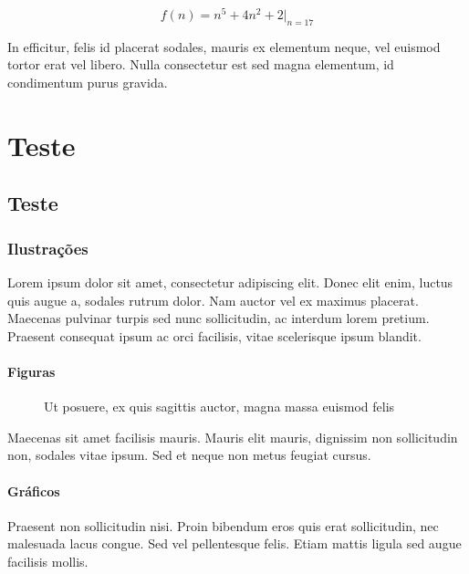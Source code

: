 \documentclass{uecetex}
\begin{document}
	\begin{equation}
		f(n) = n^5 + 4n^2 + 2 |_{n=17}
	\end{equation}
	
	In efficitur, felis id placerat sodales, mauris ex elementum neque, vel euismod tortor erat vel libero. Nulla consectetur est sed magna elementum, id condimentum purus gravida. 
	
	\chapter{Teste}
	\section{Teste}	\lipsum[1]
	
	\subsection{Ilustrações}
	
	Lorem ipsum dolor sit amet, consectetur adipiscing elit. Donec elit enim, luctus quis augue a, sodales rutrum dolor. Nam auctor vel ex maximus placerat. Maecenas pulvinar turpis sed nunc sollicitudin, ac interdum lorem pretium. Praesent consequat ipsum ac orci facilisis, vitae scelerisque ipsum blandit.
	
	\subsubsection{Figuras}
	
	\begin{figure}[h!]
		\centering
		\caption{\label{fig:example-1} Ut posuere, ex quis sagittis auctor, magna massa euismod felis}	
	\end{figure}

	Maecenas sit amet facilisis mauris. Mauris elit mauris, dignissim non sollicitudin non, sodales vitae ipsum. Sed et neque non metus feugiat cursus.

	\subsubsection{Gráficos}
	
	Praesent non sollicitudin nisi. Proin bibendum eros quis erat sollicitudin, nec malesuada lacus congue. Sed vel pellentesque felis. Etiam mattis ligula sed augue facilisis mollis.
	
\end{document}

